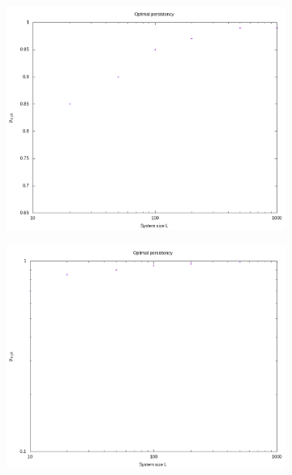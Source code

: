 \documentclass[]{scrartcl}
\begin{document}
 \begin{figure}[!hbt]
\centering
\begin{subfigure}{0.35\textwidth}
 \includegraphics[width=\textwidth]{./fig/latt/L/p_opt_logx.png}
\end{subfigure}
\begin{subfigure}{0.35\textwidth}
 \includegraphics[width=\textwidth]{./fig/latt/L/p_opt_logxy.png}
\end{subfigure}

\end{figure}
\end{document}
